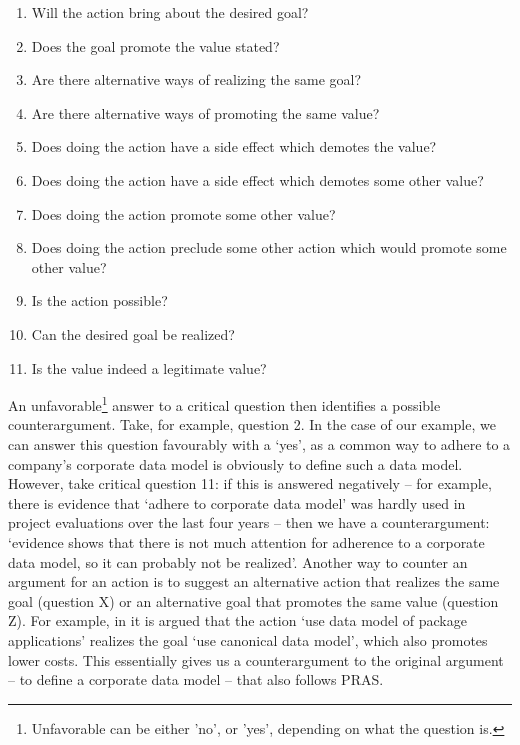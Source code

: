 \documentclass[11.5pt,two column]{llncs}
\begin{document}
\begin{enumerate}
\item Will the action bring about the desired goal?
\item Does the goal promote the value stated?
\item Are there alternative ways of realizing the same goal?
\item Are there alternative ways of promoting the same value?
\item Does doing the action have a side effect which demotes the value?
\item Does doing the action have a side effect which demotes some other value?
\item Does doing the action promote some other value?
\item Does doing the action preclude some other action which would promote some other value?
\item Is the action possible?
\item Can the desired goal be realized?
\item Is the value indeed a legitimate value?
\end{enumerate}

An unfavorable\footnote{Unfavorable can be either 'no', or 'yes', depending on what the question is.} answer to a critical question then identifies a possible counterargument. Take, for example, question 2. In the case of our example, we can answer this question favourably with a `yes', as a common way to adhere to a company's corporate data model is obviously to define such a data model. However, take critical question 11: if this is answered negatively -- for example, there is evidence that `adhere to corporate data model' was hardly used in project evaluations over the last four years \cite{vanZee-etal:er2016} -- then we have a counterargument: `evidence shows that there is not much attention for adherence to a corporate data model, so it can probably not be realized'. Another way to counter an argument for an action is to suggest an alternative action that realizes the same goal (question X) or an alternative goal that promotes the same value (question Z). For example, in \cite{vanZee-etal:er2016} it is argued that the action `use data model of package applications' realizes the goal `use canonical data model', which also promotes lower costs. This essentially gives us a counterargument to the original argument -- to define a corporate data model -- that also follows PRAS. 
\end{document}
